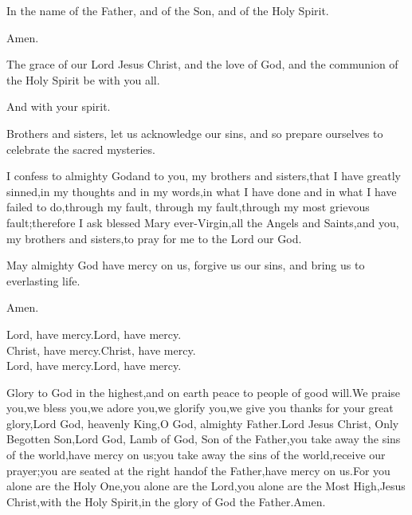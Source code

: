 \indent \pr In the name of the Father, and of the Son, and of the Holy Spirit.

\be Amen.

\pr The grace of our Lord Jesus Christ, and the love of God, and the communion of the Holy Spirit be with you all.

\be And with your spirit.

\pr Brothers and sisters, let us acknowledge our sins, and so prepare ourselves to celebrate the sacred mysteries.

\be I confess to almighty God\redast and to you, my brothers and sisters,\redast that I have greatly sinned,\redast in my thoughts and in my words,\redast in what I have done and in what I have failed to do,\redast through my fault, through my fault,\redast through my most grievous fault;\redast therefore I ask blessed Mary ever-Virgin,\redast all the Angels and Saints,\redast and you, my brothers and sisters,\redast to pray for me to the Lord our God.

\pr May almighty God have mercy on us, forgive us our sins, and bring us to everlasting life.

\be Amen.

\pr Lord, have mercy.\redast\be Lord, have mercy.\\
\indent\pr Christ, have mercy.\redast\be Christ, have mercy.\\
\indent\pr Lord, have mercy.\redast\be Lord, have mercy.

\be Glory to God in the highest,\redast and on earth peace to people of good will.\redast We praise you,\redast we bless you,\redast we adore you,\redast we glorify you,\redast we give you thanks for your great glory,\redast Lord God, heavenly King,\redast O God, almighty Father.\redast Lord Jesus Christ, Only Begotten Son,\redast Lord God, Lamb of God, Son of the Father,\redast you take away the sins of the world,\redast have mercy on us;\redast you take away the sins of the world,\redast receive our prayer;\redast you are seated at the right hand\redast of the Father,\redast have mercy on us.\redast For you alone are the Holy One,\redast you alone are the Lord,\redast you alone are the Most High,\redast Jesus Christ,\redast with the Holy Spirit,\redast in the glory of God the Father.\redast Amen.


\newpage 